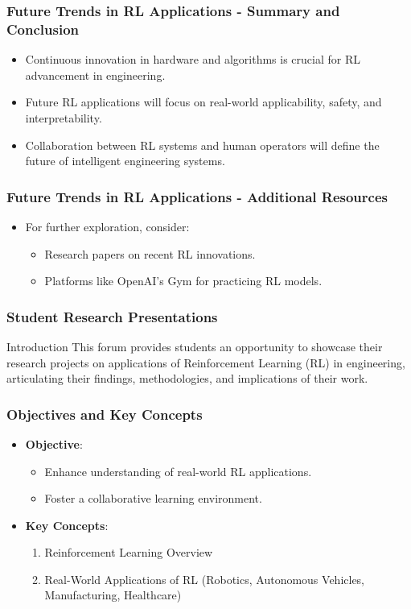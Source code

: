 \documentclass[aspectratio=169]{beamer}
\begin{document}
\begin{frame}[fragile]
  \frametitle{Future Trends in RL Applications - Summary and Conclusion}
  \begin{itemize}
    \item Continuous innovation in hardware and algorithms is crucial for RL advancement in engineering.
    \item Future RL applications will focus on real-world applicability, safety, and interpretability.
    \item Collaboration between RL systems and human operators will define the future of intelligent engineering systems.
  \end{itemize}
\end{frame}

\begin{frame}[fragile]
  \frametitle{Future Trends in RL Applications - Additional Resources}
  \begin{itemize}
    \item For further exploration, consider:
      \begin{itemize}
        \item Research papers on recent RL innovations.
        \item Platforms like OpenAI's Gym for practicing RL models.
      \end{itemize}
  \end{itemize}
\end{frame}

\begin{frame}[fragile]
  \frametitle{Student Research Presentations}
  \begin{block}{Introduction}
    This forum provides students an opportunity to showcase their research projects on applications of Reinforcement Learning (RL) in engineering, articulating their findings, methodologies, and implications of their work.
  \end{block}
\end{frame}

\begin{frame}[fragile]
  \frametitle{Objectives and Key Concepts}
  \begin{itemize}
    \item \textbf{Objective}:
      \begin{itemize}
        \item Enhance understanding of real-world RL applications.
        \item Foster a collaborative learning environment.
      \end{itemize}
    \item \textbf{Key Concepts}:
      \begin{enumerate}
        \item Reinforcement Learning Overview
        \item Real-World Applications of RL (Robotics, Autonomous Vehicles, Manufacturing, Healthcare)
      \end{enumerate}
  \end{itemize}
\end{frame}
\end{document}
